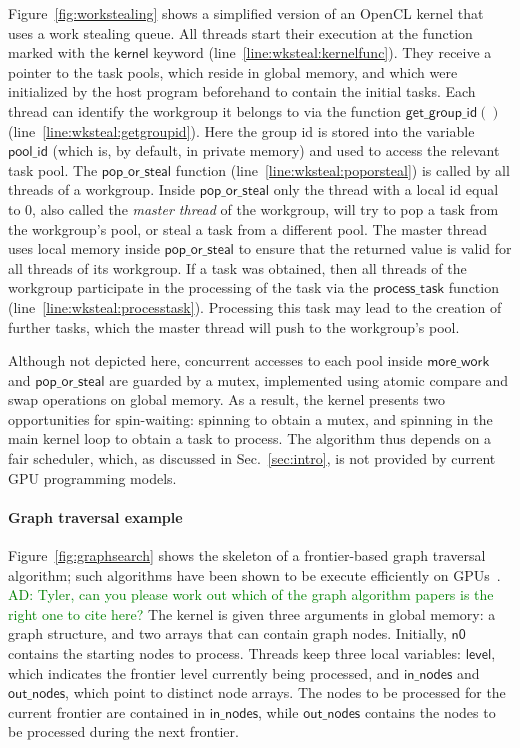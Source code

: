 \documentclass[numbers,nocopyrightspace,10pt]{sigplanconf}
\newcommand{\ADComment}[1]{\textcolor{green}{AD: #1}}
\newcommand{\myfiglong}{Figure~}
\newcommand{\mysec}{Sec.~}
\newcommand{\getgroupid}{\mathsf{get\_group\_id}}
\newcommand{\keyword}[1]{\mathsf{#1}}
\begin{document}
\myfiglong\ref{fig:workstealing} shows a simplified version of an OpenCL
kernel that uses a work stealing queue. All threads start their
execution at the function marked with the $\mathsf{kernel}$ keyword
(line~\ref{line:wksteal:kernelfunc}). They receive a pointer to the task
pools, which reside in global memory, and which were initialized by the
host program beforehand to contain the initial tasks. Each thread can
identify the workgroup it belongs to via the function $\getgroupid()$
(line~\ref{line:wksteal:getgroupid}). Here the group id is stored into
the variable $\mathsf{pool\_id}$ (which is, by default, in private
memory) and used to access the relevant task pool. The
$\mathsf{pop\_or\_steal}$ function (line~\ref{line:wksteal:poporsteal})
is called by all threads of a workgroup.  Inside
$\mathsf{pop\_or\_steal}$ only the thread with a local id equal to $0$,
also called the \emph{master thread} of the workgroup, will try to pop a
task from the workgroup's pool, or steal a task from a different
pool. The master thread uses local memory inside
$\mathsf{pop\_or\_steal}$ to ensure that the returned value is valid for
all threads of its workgroup. If a task was obtained, then all threads
of the workgroup participate in the processing of the task via the
$\mathsf{process\_task}$ function (line~\ref{line:wksteal:processtask}).
Processing this task may lead to the creation of further tasks, which
the master thread will push to the workgroup's pool.

Although not depicted here, concurrent accesses to each pool inside
$\mathsf{more\_work}$ and $\mathsf{pop\_or\_steal}$ are guarded by a
mutex, implemented using atomic compare and swap operations on
global memory.  As a result, the kernel presents two opportunities for
spin-waiting: spinning to obtain a mutex, and spinning in the main
kernel loop to obtain a task to process.  The algorithm thus depends
on a fair scheduler, which, as discussed in \mysec\ref{sec:intro},
is not provided by current GPU programming models.

\paragraph{Graph traversal example} \myfiglong\ref{fig:graphsearch} shows the
skeleton of a frontier-based graph traversal algorithm; such algorithms have
been shown to be execute efficiently on GPUs~\cite{...}. \ADComment{Tyler, can you please work out which of the graph algorithm papers is the right one to cite here?}
The kernel is
given three arguments in global memory: a graph structure, and two
arrays that can contain graph nodes. Initially, $\keyword{n0}$ contains the
starting nodes to process. Threads keep three local variables: $\keyword{level}$, which indicates the frontier level currently being
processed, and $\keyword{in\_nodes}$ and $\keyword{out\_nodes}$, which point to
distinct node arrays. The nodes to be
processed for the current frontier are contained in $\keyword{in\_nodes}$, while $\keyword{out\_nodes}$ contains
the nodes to be processed during the next frontier.
\end{document}
